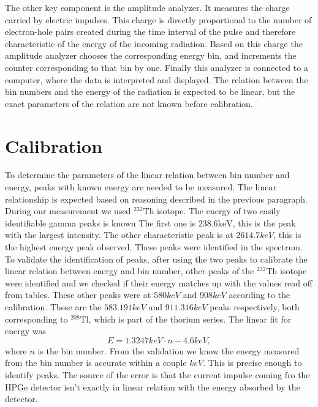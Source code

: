\documentclass[pdftex,12pt,a4paper]{article}
\begin{document}
		The other key component is the amplitude analyzer. It measures the charge carried by electric impulses. This charge is directly proportional to the number of electron-hole pairs created during the time interval of the pulse and therefore characteristic of the energy of the incoming radiation. Based on this charge the amplitude analyzer chooses the corresponding energy bin, and increments the counter corresponding to that bin by one. Finally this analyzer is connected to a computer, where the data is interpreted and displayed. The relation between the bin numbers and the energy of the radiation is expected to be linear, but the exact parameters of the relation are not known before calibration.
	\section{Calibration}
		To determine the parameters of the linear relation between bin number and energy, peaks with known energy are needed to be measured. The linear relationship is expected based on reasoning described in the previous paragraph. During our measurement we used $^{232}\text{Th}$ isotope. The energy of two easily identifiable gamma peaks is known The first one is $238.6\text{keV}$, this is the peak with the largest intensity. The other characteristic peak is at $2614.7keV$, this is the highest energy peak observed. These peaks were identified in the spectrum. To validate the identification of peaks, after using the two peaks to calibrate the linear relation between energy and bin number, other peaks of the $^{232}\text{Th}$ isotope were identified and we checked if their energy matches up with the values read off from tables. These other peaks were at $580keV$ and $908keV$ according to the calibration. These are the $583.191keV$ and $911.316keV$ peaks respectively, both corresponding to $^{208}\text{Tl}$, which is part of the thorium series. The linear fit for energy was
		\begin{equation}
			E = 1.3247keV \cdot n - 4.6keV,
		\end{equation}
		where $n$ is the bin number. From the validation we know the energy measured from the bin number is accurate within a couple $keV$. This is precise enough to identify peaks. The source of the error is that the current impulse coming fro the HPGe detector isn't exactly in linear relation with the energy absorbed by the detector.
\end{document}
